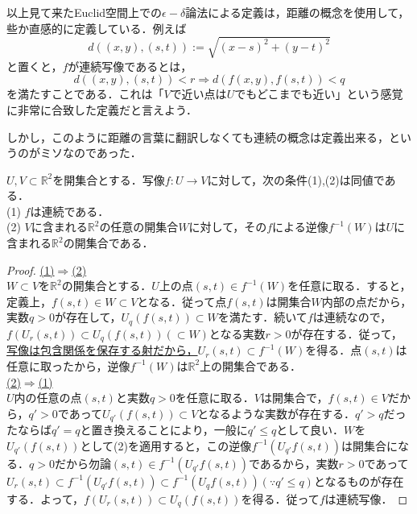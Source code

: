 \documentclass[uplatex, 12pt, a4paper, dvipdfmx]{jsarticle}
\begin{document}
以上見て来たEuclid空間上での$\epsilon -\delta$論法による定義は，距離の概念を使用して，些か直感的に定義している．例えば$$d((x,y),(s,t)):=\sqrt{(x-s)^2+(y-t)^2}$$と置くと，$f$が連続写像であるとは，$$d((x,y),(s,t))<r\Longrightarrow d(f(x,y),f(s,t))<q$$を満たすことである．これは「$V$で近い点は$U$でもどこまでも近い」という感覚に非常に合致した定義だと言えよう．\par
しかし，このように距離の言葉に翻訳しなくても連続の概念は定義出来る，というのがミソなのであった．

\begin{shadebox}\begin{definition}[連続写像の特徴付け]
    $U,V\subset\mathbb{R}^2$を開集合とする．写像$f:U\longrightarrow V$に対して，次の条件(1),(2)は同値である．\\
    (1) $f$は連続である．\\
    (2) $V$に含まれる$\mathbb{R}^2$の任意の開集合$W$に対して，その$f$による逆像$f^{-1}(W)$は$U$に含まれる$\mathbb{R}^2$の開集合である．
\end{definition}\end{shadebox}

\begin{proof}
    \underline{(1)$\Longrightarrow$(2)}\\
    $W\subset V$を$\mathbb{R}^2$の開集合とする．$U$上の点$(s,t)\in f^{-1}(W)$を任意に取る．すると，定義上，$f(s,t)\in W\subset V$となる．従って点$f(s,t)$は開集合$W$内部の点だから，実数$q>0$が存在して，$U_q(f(s,t))\subset W$を満たす．続いて$f$は連続なので，$f(U_r(s,t))\subset U_q(f(s,t))(\subset W)$となる実数$r>0$が存在する．従って，\underline{写像は包含関係を保存する射だから，}$U_r(s,t)\subset f^{-1}(W)$を得る．点$(s,t)$は任意に取ったから，逆像$f^{-1}(W)$は$\mathbb{R}^2$上の開集合である．\\
    \underline{(2)$\Longrightarrow$(1)}\\
    $U$内の任意の点$(s,t)$と実数$q>0$を任意に取る．$V$は開集合で，$f(s,t)\in V$だから，$q'>0$であって$U_{q'}(f(s,t))\subset V$となるような実数が存在する．$q'>q$だったならば$q'=q$と置き換えることにより，一般に$q'\le q$として良い．$W$を$U_{q'}(f(s,t))$として(2)を適用すると，この逆像$f^{-1}(U_{q'}f(s,t))$は開集合になる．$q>0$だから勿論$(s,t)\in f^{-1}(U_{q'}f(s,t))$であるから，実数$r>0$であって$U_r(s,t)\subset f^{-1}(U_{q'}f(s,t)) \subset f^{-1}(U_{q}f(s,t)) (\because q'\le q)$となるものが存在する．よって，$f(U_r(s,t))\subset U_q(f(s,t))$を得る．従って$f$は連続写像．
\end{proof}
\end{document}

